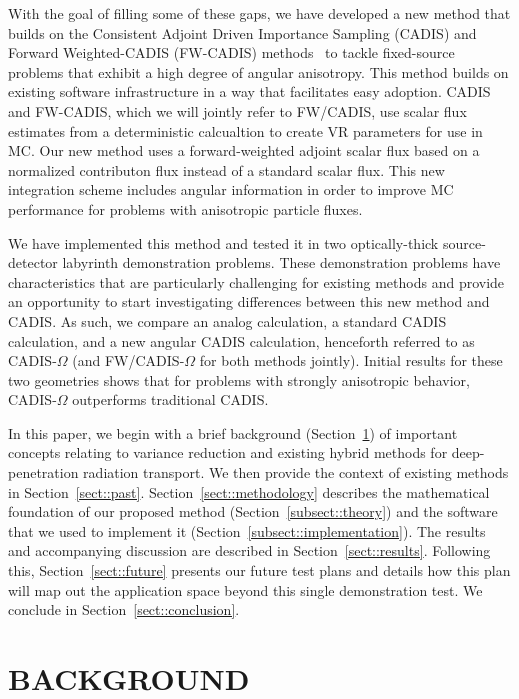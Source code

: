 \documentclass[12pt]{article}
\begin{document}
With the goal of filling some of these gaps, we have developed a new method that builds on the Consistent Adjoint Driven Importance Sampling (CADIS) and Forward Weighted-CADIS (FW-CADIS) methods~\cite{wagner_forward-weighted_2007} to tackle fixed-source problems that exhibit a high degree of angular anisotropy. 
This method builds on existing software infrastructure in a way that facilitates easy adoption.
CADIS and FW-CADIS, which we will jointly refer to FW/CADIS, use scalar flux estimates from a deterministic calcualtion to create VR parameters for use in MC.
Our new method uses a forward-weighted adjoint scalar flux based on a normalized contributon flux instead of a standard scalar flux.
This new integration scheme includes angular information in order to improve MC performance for problems with anisotropic particle fluxes.

We have implemented this method and tested it in two optically-thick source-detector labyrinth demonstration problems. 
These demonstration problems have characteristics that are particularly challenging for existing methods and provide an opportunity to start investigating differences between this new method and CADIS.
As such, we compare an analog calculation, a standard CADIS calculation, and a new angular CADIS calculation, henceforth referred to as CADIS-$\Omega$ (and FW/CADIS-$\Omega$ for both methods jointly). Initial results for these two geometries shows that for problems with strongly anisotropic behavior, CADIS-$\Omega$ outperforms traditional CADIS.

In this paper, we begin with a brief background (Section~\ref{sect::second}) of important concepts relating to variance reduction and existing hybrid methods for deep-penetration radiation transport.
We then provide the context of existing methods in Section~\ref{sect::past}. 
Section~\ref{sect::methodology} describes the mathematical foundation of our proposed method (Section~\ref{subsect::theory}) and the software that we used to implement it (Section~\ref{subsect::implementation}). 
The results and accompanying discussion are described in Section~\ref{sect::results}. Following this, Section~\ref{sect::future} presents our future test plans and details how this plan will map out the application space beyond this single demonstration test. 
We conclude in Section~\ref{sect::conclusion}. 


%
\section{BACKGROUND}
\label{sect::second}
\end{document}
